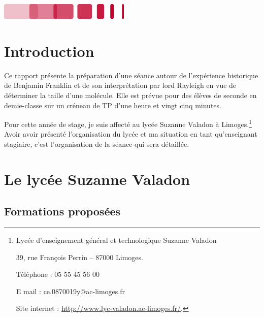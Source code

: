 \documentclass[12pt,a4paper]{article}
\begin{document}
\vfill

\hfill
\includegraphics[scale=1]{logo_bottom.png}

\thispagestyle{empty}

\newpage

\tableofcontents
\newpage

\section*{Introduction}

Ce rapport présente la préparation d'une séance autour de l'expérience historique de Benjamin Franklin et de son interprétation par lord Rayleigh en vue de déterminer la taille d'une molécule.
Elle est prévue pour des élèves de seconde en demie-classe sur un créneau de TP d'une heure et vingt cinq minutes.

Pour cette année de stage, je suis affecté au lycée Suzanne Valadon à Limoges.\footnote{Lycée d'enseignement général et technologique Suzanne Valadon

39, rue François Perrin -- 87000 Limoges.

Téléphone : 05 55 45 56 00

E mail : ce.0870019y@ac-limoges.fr

Site internet : \href{http://www.lyc-valadon.ac-limoges.fr/}{http://www.lyc-valadon.ac-limoges.fr/}.}
Avoir avoir présenté l'organisation du lycée et ma situation en tant qu'enseignant stagiaire, c'est l'organisation de la séance qui sera détaillée.

\section{Le lycée Suzanne Valadon}

\subsection{Formations proposées}
\end{document}
